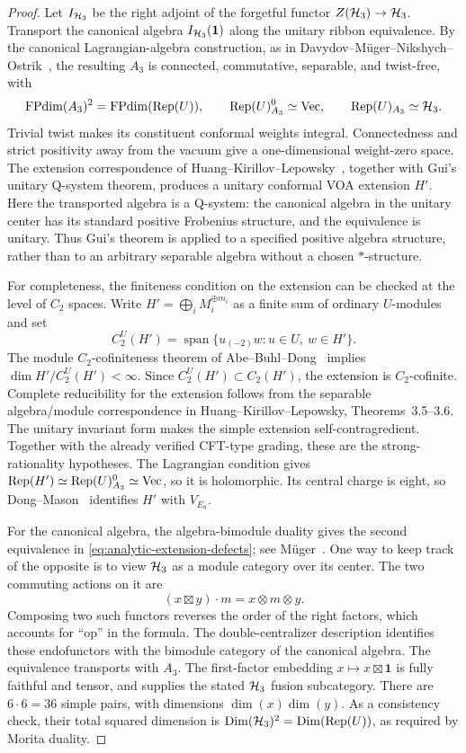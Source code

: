 \begin{proof}
Let $I_{\mathcal H_3}$ be the right adjoint of the forgetful functor
$Z(\mathcal H_3)\to\mathcal H_3$.  Transport the canonical algebra
$I_{\mathcal H_3}(\mathbf1)$ along the unitary ribbon equivalence.  By the
canonical Lagrangian-algebra construction, as in
Davydov--M\"uger--Nikshych--Ostrik~\cite[Corollary~4.1 and
Proposition~4.4]{DMNO}, the resulting $A_3$
is connected, commutative, separable, and twist-free, with
\[
 \operatorname{FPdim}(A_3)^2=\operatorname{FPdim}(\operatorname{Rep}(U)),
 \qquad \operatorname{Rep}(U)_{A_3}^{0}\simeq\mathrm{Vec},
 \qquad \operatorname{Rep}(U)_{A_3}\simeq\mathcal H_3.
\]
Trivial twist makes its constituent conformal weights integral.
Connectedness and strict positivity away from the vacuum give a
one-dimensional weight-zero space.  The extension correspondence of
Huang--Kirillov--Lepowsky~\cite[Theorems~3.2--3.6]{HKL}, together with Gui's
unitary Q-system theorem, produces a unitary conformal VOA extension
$H'$.  Here the transported algebra is a Q-system: the canonical
algebra in the unitary center has its standard positive Frobenius
structure, and the equivalence is unitary.  Thus Gui's theorem is
applied to a specified positive algebra structure, rather than
to an arbitrary separable algebra without a chosen $*$-structure.

For completeness, the finiteness condition on the extension can be
checked at the level of $C_2$ spaces.  Write
$H'=\bigoplus_i M_i^{\oplus m_i}$ as a finite sum of ordinary
$U$-modules and set
\[
 C_2^U(H')=\operatorname{span}\{u_{(-2)}w:u\in U,\ w\in H'\}.
\]
The module $C_2$-cofiniteness theorem of
Abe--Buhl--Dong~\cite[Proposition~5.2]{ABD} implies
$\dim H'/C_2^U(H')<\infty$.  Since
$C_2^U(H')\subset C_2(H')$, the extension is $C_2$-cofinite.
Complete reducibility for the extension follows from the separable
algebra/module correspondence in Huang--Kirillov--Lepowsky,
Theorems~3.5--3.6.  The unitary invariant form makes the simple
extension self-contragredient.  Together with the already verified
CFT-type grading, these are the strong-rationality hypotheses.
The Lagrangian condition gives
$\operatorname{Rep}(H')\simeq\operatorname{Rep}(U)_{A_3}^0\simeq\mathrm{Vec}$, so it is holomorphic.
Its central charge is eight, so
Dong--Mason~\cite[Theorem~1]{DM} identifies $H'$ with $V_{E_8}$.

For the canonical algebra, the algebra-bimodule duality gives the
second equivalence in \eqref{eq:analytic-extension-defects}; see
M\"uger~\cite[Sections~4 and~8]{Mueger}.  One way to keep track of the opposite
is to view $\mathcal H_3$ as a module category over its center.  The two
commuting actions on it are
\[
 (x\boxtimes y)\cdot m=x\otimes m\otimes y.
\]
Composing two such functors reverses the order of the right factors,
which accounts for ``op'' in the formula.  The double-centralizer
description identifies these endofunctors with the bimodule category
of the canonical algebra.  The equivalence transports with $A_3$.
The first-factor embedding $x\mapsto x\boxtimes\mathbf1$ is fully
faithful and tensor, and supplies the stated $\mathcal H_3$ fusion subcategory.
There are $6\cdot6=36$ simple pairs, with dimensions
$\dim(x)\dim(y)$.  As a consistency check, their total squared
dimension is $\operatorname{Dim}(\mathcal H_3)^2
=\operatorname{Dim}(\operatorname{Rep}(U))$, as required by Morita duality.
\end{proof}

